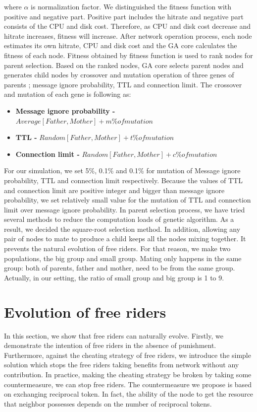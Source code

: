 \documentclass[12pt,journal,draftcls,letterpaper,onecolumn]{IEEEtran}
\begin{document}
where $\alpha$ is normalization factor. We distinguished the fitness function with positive and
negative part. Positive part includes the hitrate and negative part consists of the CPU and disk
cost. Therefore, as CPU and disk cost decrease and hitrate increases, fitness will increase.
After network operation process, each node estimates its own hitrate, CPU and disk cost and
the GA core calculates the fitness of each node. Fitness obtained by fitness function is used to
rank nodes for parent selection. Based on the ranked nodes, GA core selects parent nodes and
generates child nodes by crossover and mutation operation of three genes of parents ;
message ignore probability, TTL and connection limit. The crossover and mutation of each
gene is following as:\\

\begin{itemize}
\item{\bf Message ignore probability -}
$Average[Father, Mother] + m\% of mutation$
\item{\bf TTL -}
$Random[Father, Mother] + t\% of mutation$
\item{\bf Connection limit -}
$Random[Father, Mother] + c\% of mutation$\\
\end{itemize}

For our simulation, we set 5\%, 0.1\% and 0.1\% for mutation of Message ignore probability,
TTL and connection limit respectively. Because the values of TTL and connection limit are
positive integer and bigger than message ignore probability, we set relatively small value for
the mutation of TTL and connection limit over message ignore probability. In parent selection
process, we have tried several methods to reduce the computation loads of genetic algorithm.
As a result, we decided the square-root selection method\cite{genetic}. In addition, allowing any pair of
nodes to mate to produce a child keeps all the nodes mixing together. It prevents the natural
evolution of free riders. For that reason, we make two populations, the big group and small
group. Mating only happens in the same group: both of parents, father and mother, need to be
from the same group. Actually, in our setting, the ratio of small group and big group is 1 to 9.

\section{Evolution of free riders}\label{sec:evolution}
In this section, we show that free riders can naturally evolve. Firstly, we demonstrate the
intention of free riders in the absence of punishment. Furthermore, against the cheating
strategy of free riders, we introduce the simple solution which stops the free riders taking
benefits from network without any contribution. In practice, making the cheating strategy be
broken by taking some countermeasure, we can stop free riders. The countermeasure we
propose is based on exchanging reciprocal token. In fact, the ability of the node to get the
resource that neighbor possesses depends on the number of reciprocal tokens.
\end{document}
